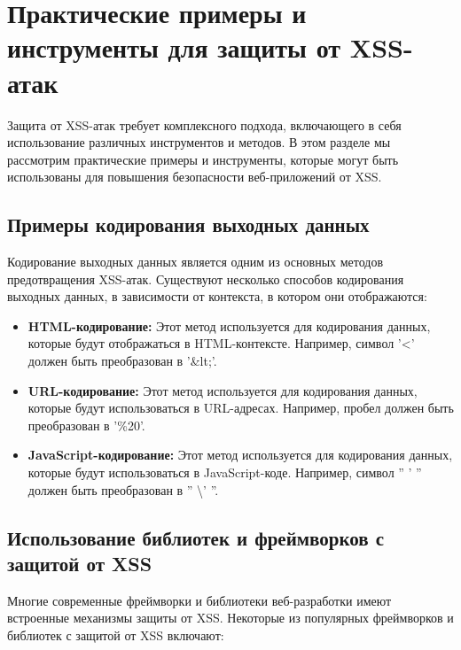 \documentclass[a4paper,12pt]{diplom}
\begin{document}
	 
	 
	 
	 
	 
	 
	 
	 
	 
	 
	 \section{Практические примеры и инструменты для защиты от XSS-атак}
	 
	 Защита от XSS-атак требует комплексного подхода, включающего в себя использование различных инструментов и методов. В этом разделе мы рассмотрим практические примеры и инструменты, которые могут быть использованы для повышения безопасности веб-приложений от XSS.
	 
	 \subsection{Примеры кодирования выходных данных}
	 
	 Кодирование выходных данных является одним из основных методов предотвращения XSS-атак. Существуют несколько способов кодирования выходных данных, в зависимости от контекста, в котором они отображаются:
	 
	 \begin{itemize}
	 	\item \textbf{HTML-кодирование:} Этот метод используется для кодирования данных, которые будут отображаться в HTML-контексте. Например, символ '<' должен быть преобразован в '\&lt;'.
	 	\item \textbf{URL-кодирование:} Этот метод используется для кодирования данных, которые будут использоваться в URL-адресах. Например, пробел должен быть преобразован в '\%20'.
	 	\item \textbf{JavaScript-кодирование:} Этот метод используется для кодирования данных, которые будут использоваться в JavaScript-коде. Например, символ '' ' '' должен быть преобразован в '' \textbackslash' ''.
	 \end{itemize}
	 
	 \subsection{Использование библиотек и фреймворков с защитой от XSS}
	 
	 Многие современные фреймворки и библиотеки веб-разработки имеют встроенные механизмы защиты от XSS. Некоторые из популярных фреймворков и библиотек с защитой от XSS включают:
	 
\end{document}
